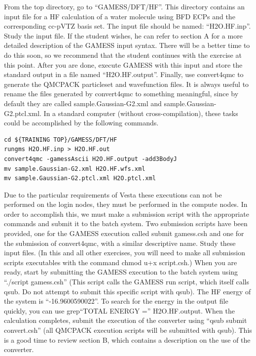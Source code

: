 From the top directory, go to ``GAMESS/DFT/HF''. This directory contains an input
file for a HF calculation of a water molecule using BFD ECPs and the corresponding
cc-pVTZ basis set. The input file should be named: “H2O.HF.inp”. Study the input
file. If the student wishes, he can refer to section A for a more detailed description of the
GAMESS input syntax. There will be a better time to do this soon, so we recommend
that the student continues with the exercise at this point. After you are done, execute
GAMESS with this input and store the standard output in a file named ``H2O.HF.output''.
Finally, use convert4qmc to generate the QMCPACK particleset and wavefunction files. It
is always useful to rename the files generated by convert4qmc to something meaningful,
since by default they are called sample.Gaussian-G2.xml and sample.Gaussian-G2.ptcl.xml.
In a standard computer (without cross-compilation), these tasks could be accomplished by
the following commands.
\begin{shaded}
\begin{verbatim}
cd ${TRAINING TOP}/GAMESS/DFT/HF
rungms H2O.HF.inp > H2O.HF.out
convert4qmc -gamessAscii H2O.HF.output -add3BodyJ
mv sample.Gaussian-G2.xml H2O.HF.wfs.xml
mv sample.Gaussian-G2.ptcl.xml H2O.ptcl.xml
\end{verbatim}
\end{shaded}
\noindent

Due to the particular requirements of Vesta these executions can not be performed on
the login nodes, they must be performed in the compute nodes. In order to accomplish
this, we must make a submission script with the appropriate commands and submit it to
the batch system. Two submission scripts have been provided, one for the GAMESS 
execution called submit gamess.csh and one for the submission of convert4qmc, with a similar
descriptive name. Study these input files. (In this and all other exercises, you will need
to make all submission scripts executables with the command chmod u+x script.csh.)
When you are ready, start by submitting the GAMESS execution to the batch system
using ``./script gamess.csh'' (This script calls the GAMESS run script, which itself calls
qsub. Do not attempt to submit this specific script with qsub). The HF energy of the
system is ``-16.9600590022''. To search for the energy in the output file quickly, you can
use grep“TOTAL ENERGY =” H2O.HF.output. When the calculation completes,
submit the execution of the converter using ``qsub submit convert.csh'' (all QMCPACK execution 
scripts will be submitted with qsub). This is a good time to review section B, which
contains a description on the use of the converter.


